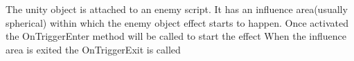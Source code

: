 The unity object is attached to an enemy script. It has an influence area(usually spherical) within which the enemy object effect starts to happen. Once activated the On\+Trigger\+Enter method will be called to start the effect When the influence area is exited the On\+Trigger\+Exit is called 